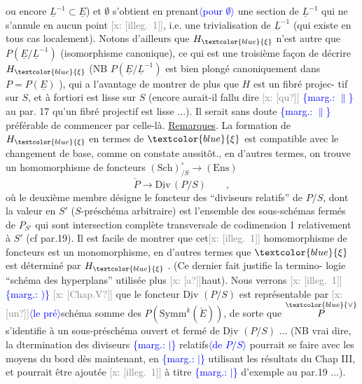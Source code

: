 \documentclass[11pt]{article}
\newcommand{\scanpage}[1]{\par\bigskip\noindent{\small\sffamily[scan #1]}\par}
\newcommand{\mspage}[1]{{\small\sffamily[p.\,#1]}}
\newcommand{\hand}[1]{\textcolor{blue}{#1}}
\let\over\relax
\newcommand{\over}[2]{\textcolor{gray}{#1}\textcolor{blue}{\ensuremath{^{\!\nearrow}}#2}}
\newcommand{\inserted}[2][]{\textcolor{blue}{$\langle$#2$\rangle$}}
\newcommand{\margin}[1]{\textcolor{blue}{\{\textsf{marg.:} #1\}}}
\newcommand{\xout}[1]{\textcolor{gray}{[\textsf{x:} #1]}}
\newcommand{\uline}[1]{\underline{#1}}
\newcommand{\unsure}[1]{[#1?]}
\newcommand{\illegible}[1]{[\textsf{illeg.\ #1}]}
\begin{document}
\mspage{\hand{4}}

\clearpage
\scanpage{25/5}
\mspage{2}

ou encore $\underline{L}^{-1}\subset\underline{E}$) et $\emptyset$ s'obtient en prenant\inserted{pour $\emptyset$} une section de $\underline{L}^{-1}$ qui
ne s'annule en aucun point \xout{\illegible{1}}, i.e. une trivialisation de $\underline{L}^{-1}$
(qui existe en tous cas localement). Notons d'ailleurs que $H_{\hand{\xi}}$ n'est
autre que $P(\underline{E}/\underline{L}^{-1})$ (isomorphisme canonique), ce qui est une troisième
façon de décrire $H_{\hand{\xi}}$ (NB $P(\underline{E}/\underline{L}^{-1})$ est bien plongé canoniquement dans
$P = P(\underline{E})$ ), qui a l'avantage de montrer de plus que $H$ est un fibré projec-%
tif sur $S$, et à fortiori est lisse sur $S$ (encore aurait-il fallu dire \xout{\unsure{qu}}
\margin{$\|$} au par. 17 qu'un fibré projectif est lisse ...). Il serait sans doute
\margin{$\|$} préférable de commencer par celle-là.
\uline{Remarques}. La formation de $H_{\hand{\xi}}$ en termes de $\hand{\xi}$ est compatible avec
le changement de base, comme on constate aussitôt., en d'autres termes,
on trouve un homomorphisme de foncteurs $(\mathrm{Sch})^{\circ}_{/S}\to(\mathrm{Ens})$
\[ \check{P} \longrightarrow \underline{\mathrm{Div}}\,(P/S) \qquad , \]
où le deuxième membre désigne le foncteur des ``diviseurs relatifs'' de $P/S$,
dont la valeur en $S'$ ($S$-préschéma arbitraire) est l'ensemble des
sous-schémas fermés de $P_{S'}$ qui sont intersection complète transversale
de codimension 1 relativement à $S'$ (cf par.19). Il est facile de montrer
que cet\xout{\illegible{1}} homomorphisme de foncteurs est un monomorphisme, en d'autres
termes que $\hand{\xi}$ est déterminé par $H_{\hand{\xi}}$ . (Ce dernier fait justifie la termino-%
logie ``schéma des hyperplans'' utilisée plus \xout{\unsure{a}}haut). Nous verrons \xout{\illegible{1}} \margin{)}
\xout{\unsure{Chap.V}} que le foncteur $\underline{\mathrm{Div}}$ $(P/S)$ est représentable par \xout{\unsure{un}}\inserted{le pré}schéma somme
des $P(\mathrm{Symm}^{k}(\check{E}))$, de sorte que $\overset{\hand{\vee}}{P}$ s'identifie à un sous-préschéma ouvert
et fermé de $\underline{\mathrm{Div}}$ $(P/S)$ ... (NB \over{A}{À} vrai dire, la d\over{e}{é}termination des diviseurs
\margin{$|$} relatifs\inserted{de $P/S$} pourrait se faire avec les moyens du bord dès maintenant, en
\margin{$|$} utilisant les résultats du Chap III, et pourrait être ajoutée \xout{\illegible{1}} à titre
\margin{$|$} d'exemple au par.19 ...).
\end{document}
